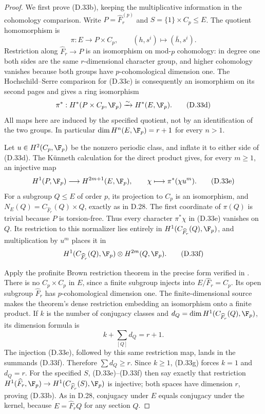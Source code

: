 \begin{proof}
We first prove (D.33b), keeping the multiplicative information in
the cohomology comparison.  Write $P=\widehat F_r^{(p)}$ and
$S=\{1\}\times C_p\leq E$.  The quotient homomorphism is
\[
 \pi:E\longrightarrow P\times C_p,\qquad
              (h,s^i)\longmapsto(\bar h,s^i).              \tag{D.33c}
\]
Restriction along $\widehat F_r\to P$ is an isomorphism on
mod-$p$ cohomology: in degree one both sides are the same
$r$-dimensional character group, and higher cohomology vanishes
because both groups have $p$-cohomological dimension one.
The Hochschild--Serre comparison for (D.33c) is consequently an
isomorphism on its second pages and gives a ring isomorphism
\[
 \pi^*:H^*(P\times C_p,\F_p)\xrightarrow{\sim}H^*(E,\F_p).
                                                        \tag{D.33d}
\]
All maps here are induced by the specified quotient, not by an
identification of the two groups.  In particular
$\dim H^n(E,\F_p)=r+1$ for every $n>1$.

Let $u\in H^2(C_p,\F_p)$ be the nonzero periodic class, and
inflate it to either side of (D.33d).  The K\"unneth calculation
for the direct product gives, for every $m\geq1$, an injective map
\[
 H^1(P,\F_p)\longrightarrow H^{2m+1}(E,\F_p),
                         \qquad\chi\longmapsto\pi^*(\chi u^m).
                                                        \tag{D.33e}
\]
For a subgroup $Q\leq E$ of order $p$, its projection to
$C_p$ is an isomorphism, and
$N_E(Q)=C_{\widehat F_r}(Q)\times Q$, exactly as in D.28.
The first coordinate of $\pi(Q)$ is trivial because $P$ is
torsion-free.  Thus every character $\pi^*\chi$ in (D.33e)
vanishes on $Q$.  Its restriction to this normalizer lies
entirely in $H^1(C_{\widehat F_r}(Q),\F_p)$, and multiplication
by $u^m$ places it in
\[
 H^1(C_{\widehat F_r}(Q),\F_p)\otimes H^{2m}(Q,\F_p).
                                                        \tag{D.33f}
\]

Apply the profinite Brown restriction theorem in the precise
form verified in \cite[Theorem 2 and \S1.1]{A-KochloukovaZalesskii2007}.
There is no $C_p\times C_p$ in $E$, since a finite subgroup
injects into $E/\widehat F_r=C_p$.  Its open subgroup
$\widehat F_r$ has $p$-cohomological dimension one.  The
finite-dimensional source makes the theorem's dense restriction
embedding an isomorphism onto a finite product.  If $k$ is
the number of conjugacy classes and
$d_Q=\dim H^1(C_{\widehat F_r}(Q),\F_p)$, its dimension formula is
\[
                   k+\sum_{[Q]}d_Q=r+1.                  \tag{D.33g}
\]
The injection (D.33e), followed by this same restriction map,
lands in the summands (D.33f).  Therefore
$\sum d_Q\geq r$.  Since $k\geq1$, (D.33g) forces
$k=1$ and $d_Q=r$.  For the specified $S$, (D.33e)--(D.33f)
then say exactly that restriction
$H^1(\widehat F_r,\F_p)\to H^1(C_{\widehat F_r}(S),\F_p)$
is injective; both spaces have dimension $r$, proving (D.33b).
As in D.28, conjugacy under $E$ equals conjugacy under the kernel,
because $E=\widehat F_r Q$ for any section $Q$.


\end{proof}
